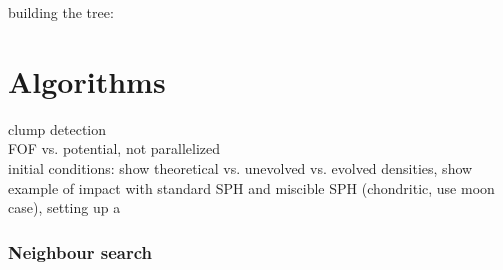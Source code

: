 building the tree:


\section{Algorithms}
clump detection\\
FOF vs. potential, not parallelized\\
initial conditions: show theoretical vs. unevolved vs. evolved densities, show example of impact with standard SPH and miscible SPH (chondritic, use moon case), setting up a \SSC \\


\subsubsection{Neighbour search}

\citep{Barnes:1986p2853}
\citep{Monaghan:2005p2677}
\citep{Price:2004p2613}
